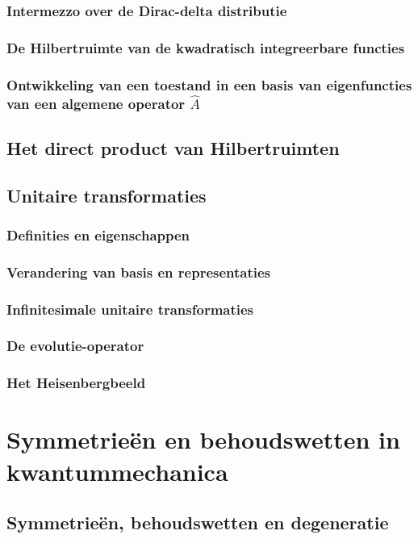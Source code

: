 \documentclass[a4paper,twoside]{article}
\theoremstyle{definition}
\theoremstyle{plain}
\begin{document}
\subsubsection{Intermezzo over de Dirac-delta distributie}
\subsubsection{De Hilbertruimte van de kwadratisch integreerbare functies}
\subsubsection{Ontwikkeling van een toestand in een basis van eigenfuncties van een algemene operator $\hat{A}$}
\subsection{Het direct product van Hilbertruimten}
\subsection{Unitaire transformaties}
\subsubsection{Definities en eigenschappen}
\subsubsection{Verandering van basis en representaties}
\subsubsection{Infinitesimale unitaire transformaties}
\subsubsection{De evolutie-operator}
\subsubsection{Het Heisenbergbeeld}

\section{Symmetrieën en behoudswetten in kwantummechanica}
\subsection{Symmetrieën, behoudswetten en degeneratie}
\end{document}
